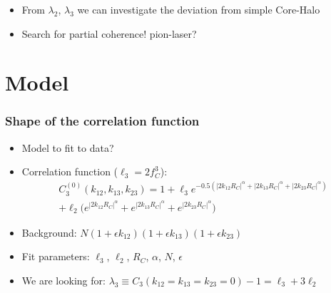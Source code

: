 \documentclass{beamer}
\begin{document}
\begin{frame}
\begin{minipage}{0.4\textwidth}
\begin{figure}
\end{figure}
\end{minipage}
\begin{minipage}{0.59\textwidth}
\begin{itemize}
\setlength{\itemsep}{8pt}
\vspace*{-40pt}\item From $\lambda_2$, $\lambda_3$ we can investigate the deviation from simple Core-Halo
\item Search for partial coherence! pion-laser?
\end{itemize}
\end{minipage}
\end{frame}

\section{Model}
\begin{frame}
\frametitle{Shape of the correlation function}
\begin{itemize}
\setlength{\itemsep}{20pt}
\item Model to fit to data?
\item Correlation function ($\ell_3=2f_C^3$):
\begin{align*}
C_3^{(0)}(k_{12}, k_{13}, k_{23}) = 1+ \ell_3e^{-0.5(|2k_{12}R_C|^\alpha+|2k_{13}R_C|^\alpha+|2k_{23}R_C|^\alpha)}\nonumber\\
+\ell_2\bigg(e^{|2k_{12}R_C|^\alpha}+e^{|2k_{13}R_C|^\alpha}+e^{|2k_{23}R_C|^\alpha}\bigg)
\end{align*}
\item Background: $N(1+\epsilon k_{12})(1+\epsilon k_{13})(1+\epsilon k_{23})$
\item Fit parameters: $\ell_3$, $\ell_2$,  $R_C$, $\alpha$, $N$, $\epsilon$
\item We are looking for: $\lambda_3 \equiv  C_3(k_{12}=k_{13}=k_{23}=0)-1=\ell_3+3\ell_2$
\end{itemize}
\end{frame}
\end{document}
